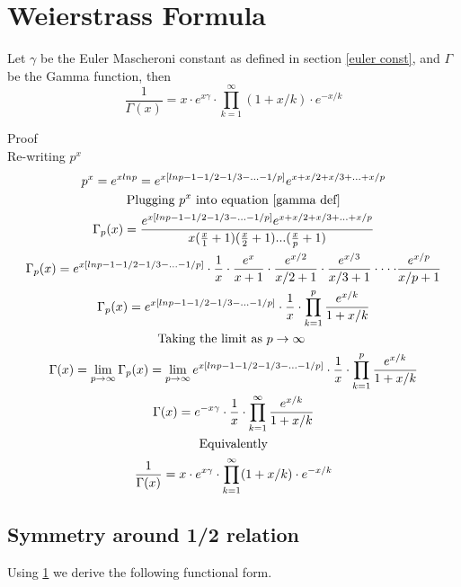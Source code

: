 \documentclass[a4paper]{article}
\begin{document}
\section{Weierstrass Formula}\label{Weierstrass}
\begin{theorem}\label{partial form}
Let $\gamma$ be the Euler Mascheroni constant as defined in section \ref{euler const}, and $\Gamma$ be the Gamma function, then
\begin{equation} \label{gamma product}
\frac{1}{\Gamma(x)}  = x \cdot e^{x \gamma} \cdot \prod_{k=1}^{\infty} (1 + x/k) \cdot e^{-x/k}
\end{equation}

Proof
\\
Re-writing $p^x$
\begin{gather*}
p^x = e^{x lnp} = e^{x [lnp - 1 - 1/2 - 1/3 - ... - 1/p]} e^{x + x/2 + x/3 + ... + x/p} \\
\text{Plugging $p^x$ into equation \ref{gamma def}} \\
\Gamma_{p}(x) = \frac{e^{x [lnp - 1 - 1/2 - 1/3 - ... - 1/p]} e^{x + x/2 + x/3 + ... + x/p}}{x (\frac{x}{1} + 1)(\frac{x}{2} + 1)...(\frac{x}{p} + 1)}   \\
\Gamma_{p}(x) = e^{x [lnp - 1 - 1/2 - 1/3 - ... - 1/p]} \cdot \frac{1}{x} \cdot \frac{e^{x}}{x+1} \cdot \frac{e^{x/2}}{x/2+1} \cdot \frac{e^{x/3}}{x/3+1}
\cdot \cdot \cdot \cdot \frac{e^{x/p}}{x/p+1}
\\
\Gamma_{p}(x) = e^{x [lnp - 1 - 1/2 - 1/3 - ... - 1/p]} \cdot \frac{1}{x} \cdot \prod_{k=1}^{p} \frac{e^{x/k}}{1 + x/k} \\
\text{Taking the limit as $p \to \infty$ }\\
\Gamma(x) = \lim_{p \to \infty} \Gamma_{p}(x) = 
\lim_{p \to \infty} e^{x [lnp - 1 - 1/2 - 1/3 - ... - 1/p]} \cdot \frac{1}{x} \cdot \prod_{k=1}^{p} \frac{e^{x/k}}{1 + x/k} \\
\Gamma(x) = e^{-x \gamma} \cdot  \frac{1}{x} \cdot \prod_{k=1}^{\infty} \frac{e^{x/k}}{1 + x/k}  \\
\text{Equivalently}\\
\frac{1}{\Gamma(x)}  = x \cdot e^{x \gamma} \cdot \prod_{k=1}^{\infty} (1 + x/k) \cdot e^{-x/k}  \\
\end{gather*}
\end{theorem}

\subsection{Symmetry around 1/2 relation}\label{Symmetric Gamma}
Using \ref{Weierstrass} we derive the following functional form. 
\end{document}
